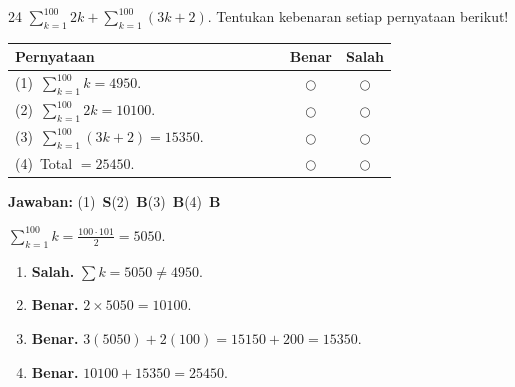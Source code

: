\documentclass[11pt]{article}
\newcommand{\jawaban}[1]{%
  \noindent\colorbox{gold!30}{\parbox{\dimexpr\linewidth-2\fboxsep\relax}{%
    \textbf{Jawaban:} #1}}\par\smallskip}
\begin{document}
\begin{soal}{24}
$\displaystyle\sum_{k=1}^{100}2k+\sum_{k=1}^{100}(3k+2)$.
Tentukan kebenaran setiap pernyataan berikut!

\par\smallskip
{\renewcommand{\arraystretch}{1.4}%
\begin{tabular}{@{}p{0.76\linewidth}cc@{}}
\hline\textbf{Pernyataan}&\textbf{Benar}&\textbf{Salah}\\\hline
(1)~$\displaystyle\sum_{k=1}^{100}k=4950$.&$\bigcirc$&$\bigcirc$\\
(2)~$\displaystyle\sum_{k=1}^{100}2k=10100$.&$\bigcirc$&$\bigcirc$\\
(3)~$\displaystyle\sum_{k=1}^{100}(3k+2)=15350$.&$\bigcirc$&$\bigcirc$\\
(4)~Total $=25450$.&$\bigcirc$&$\bigcirc$\\\hline
\end{tabular}}
\end{soal}
\begin{pembox}
\jawaban{(1)~\textbf{S}\quad(2)~\textbf{B}\quad(3)~\textbf{B}\quad(4)~\textbf{B}}
$\sum_{k=1}^{100}k=\tfrac{100\cdot101}{2}=5050$.
\begin{enumerate}[leftmargin=*,topsep=2pt,itemsep=2pt]
\item \textbf{Salah.} $\sum k=5050\neq4950$.
\item \textbf{Benar.} $2\times5050=10100$.
\item \textbf{Benar.} $3(5050)+2(100)=15150+200=15350$.
\item \textbf{Benar.} $10100+15350=25450$.
\end{enumerate}
\end{pembox}
\end{document}

